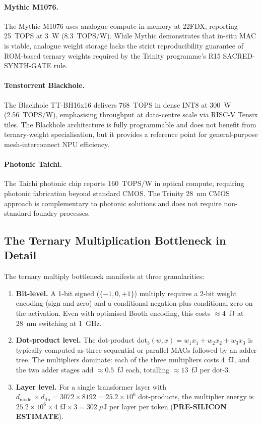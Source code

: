 \paragraph{Mythic M1076.}  The Mythic M1076 \cite{mythic_m1076_2021} uses
analogue compute-in-memory at 22FDX, reporting 25~TOPS at 3~W (8.3~TOPS/W).
While Mythic demonstrates that in-situ MAC is viable, analogue weight storage
lacks the strict reproducibility guarantee of ROM-based ternary weights required
by the Trinity programme's R15 SACRED-SYNTH-GATE rule.

\paragraph{Tenstorrent Blackhole.}  The Blackhole TT-BH16x16
\cite{tenstorrent_blackhole_2025} delivers 768~TOPS in dense INT8 at 300~W
(2.56~TOPS/W), emphasising throughput at data-centre scale via RISC-V Tensix
tiles.  The Blackhole architecture is fully programmable and does not benefit
from ternary-weight specialisation, but it provides a reference point for
general-purpose mesh-interconnect NPU efficiency.

\paragraph{Photonic Taichi.}  The Taichi photonic chip \cite{photonic_taichi_2024}
reports 160~TOPS/W in optical compute, requiring photonic fabrication beyond
standard CMOS.  The Trinity 28~nm CMOS approach is complementary to photonic
solutions and does not require non-standard foundry processes.

\subsection{The Ternary Multiplication Bottleneck in Detail}

The ternary multiply bottleneck manifests at three granularities:

\begin{enumerate}
  \item \textbf{Bit-level.}  A 1-bit signed ($\{-1,0,+1\}$) multiply requires
    a 2-bit weight encoding (sign and zero) and a conditional negation plus
    conditional zero on the activation.  Even with optimised Booth encoding,
    this costs $\approx 4$~fJ at 28~nm switching at 1~GHz.

  \item \textbf{Dot-product level.}  The dot-product $\text{dot}_3(w,x) = w_1 x_1
    + w_2 x_2 + w_3 x_3$ is typically computed as three sequential or parallel
    MACs followed by an adder tree.  The multipliers dominate: each of the three
    multipliers costs 4~fJ, and the two adder stages add $\approx 0.5$~fJ each,
    totalling $\approx 13$~fJ per dot-3.

  \item \textbf{Layer level.}  For a single transformer layer with $d_{\mathrm{model}}
    \times d_{\mathrm{ffn}} = 3072 \times 8192 = 25.2 \times 10^6$ dot-products,
    the multiplier energy is $25.2 \times 10^6 \times 4\text{ fJ} \times 3 = 302\;\mu\text{J}$
    per layer per token (\textbf{PRE-SILICON ESTIMATE}).
\end{enumerate}

